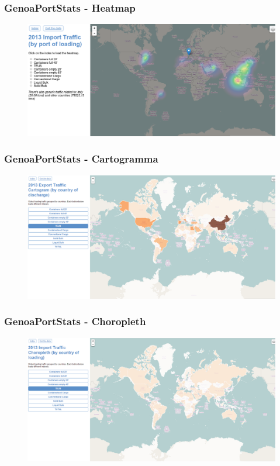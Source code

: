 \documentclass{beamer}
\begin{document}
\begin{frame}
\frametitle{GenoaPortStats - Heatmap} 
\begin{figure}
\includegraphics[width=\textwidth]{../img/portstats_loadingtraffic.png} 
\end{figure}
\end{frame}

\begin{frame}
\frametitle{GenoaPortStats - Cartogramma} 
\begin{figure}
\includegraphics[width=\textwidth]{../img/portstats_cartogram.png} 
\end{figure}
\end{frame}

\begin{frame}
\frametitle{GenoaPortStats - Choropleth} 
\begin{figure}
\includegraphics[width=\textwidth]{../img/portstats_choropleth.png} 
\end{figure}
\end{frame}
\end{document}
